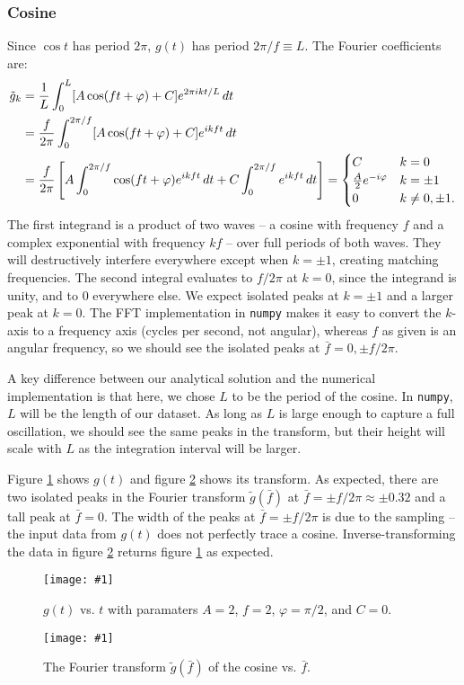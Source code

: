 \documentclass{article}
\theoremstyle{definition}
\newcommand{\cc}{\texttt}
\newcommand{\plop}[2]{
    \begin{figure}\centering
        \texttt{[image: \#1]}
        \caption{\label{#1}#2}
    \end{figure}
}
\begin{document}
\subsubsection{Cosine}

Since $\cos t$ has period $2\pi$, $g(t)$ has period $2\pi/f \equiv L$.
The Fourier coefficients are:
\begin{align*}
\tilde g_k
&= {1 \over L} \int_0^L [A \cos(ft + \varphi) + C]
e^{2\pi i k t / L} \, dt \\
&= {f \over 2\pi} \int_0^{2\pi/f} [A \cos(ft + \varphi) + C]
e^{i k f t} \, dt \\
&= {f \over 2\pi}
\left[
A \int_0^{2\pi/f} \cos(ft + \varphi)
e^{i k f t} \, dt
+ C  \int_0^{2\pi/f}
e^{i k f t} \, dt
\right]
=
\begin{cases}
C & k = 0 \\
{A \over 2} e^{-i\varphi} & k = \pm 1 \\
0 & k \not= 0, \pm 1.
\end{cases}
\end{align*}
The first integrand is a product of two waves -- a cosine with
frequency $f$ and a complex exponential with frequency $kf$ --
over full periods of both waves.
They will destructively interfere everywhere except when $k = \pm 1$,
creating matching frequencies.
The second integral evaluates to $f/2\pi$ at $k = 0$, since the integrand
is unity, and to 0 everywhere else.
We expect isolated peaks at $k = \pm 1$ and a larger
peak at $k = 0$. The FFT implementation in
\cc{numpy} makes it easy to convert the $k$-axis to a
frequency axis (cycles per second, not angular), whereas $f$ as given
is an angular frequency, so we should see the
isolated peaks at $\bar f = 0, \pm f/2\pi$.

A key difference between our analytical solution and the numerical
implementation is that here, we chose $L$ to be the period of the cosine.
In \cc{numpy}, $L$ will be the length of our dataset. As long as $L$
is large enough to capture a full oscillation, we should see the
same peaks in the transform, but their height will scale with $L$ as
the integration interval will be larger.

Figure \ref{g.pdf} shows $g(t)$ and figure \ref{Fg.pdf} shows its
transform.
As expected, there are two isolated peaks in the Fourier transform
$\tilde g(\bar f)$ at $\bar f = \pm f/2\pi \approx \pm 0.32$ and
a tall peak at $\bar f = 0$. The width
of the peaks at $\bar f = \pm f/2\pi$
is due to the sampling -- the input data from
$g(t)$ does not perfectly trace a cosine. Inverse-transforming the data
in figure \ref{Fg.pdf} returns figure \ref{g.pdf} as expected.
\plop{g.pdf}{$g(t)$ vs. $t$ with paramaters
$A = 2$, $f = 2$, $\varphi = \pi/2$, and $C = 0$.}
\plop{Fg.pdf}{The Fourier transform $\tilde g(\bar f)$ of the cosine
vs. $\bar f$.}
\end{document}
